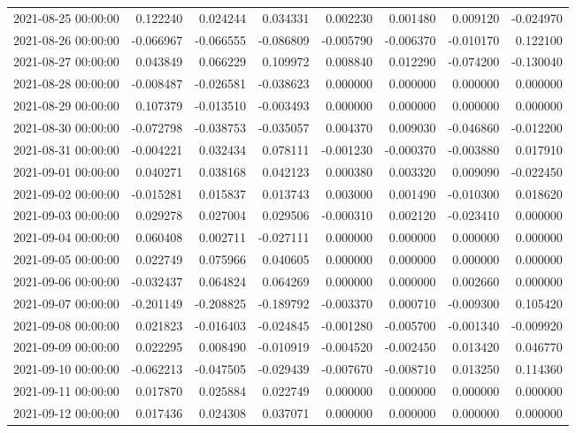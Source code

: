 \begin{tabular}{lrrrrrrr}
2021-08-25 00:00:00 & 0.122240 & 0.024244 & 0.034331 & 0.002230 & 0.001480 & 0.009120 & -0.024970 \\
2021-08-26 00:00:00 & -0.066967 & -0.066555 & -0.086809 & -0.005790 & -0.006370 & -0.010170 & 0.122100 \\
2021-08-27 00:00:00 & 0.043849 & 0.066229 & 0.109972 & 0.008840 & 0.012290 & -0.074200 & -0.130040 \\
2021-08-28 00:00:00 & -0.008487 & -0.026581 & -0.038623 & 0.000000 & 0.000000 & 0.000000 & 0.000000 \\
2021-08-29 00:00:00 & 0.107379 & -0.013510 & -0.003493 & 0.000000 & 0.000000 & 0.000000 & 0.000000 \\
2021-08-30 00:00:00 & -0.072798 & -0.038753 & -0.035057 & 0.004370 & 0.009030 & -0.046860 & -0.012200 \\
2021-08-31 00:00:00 & -0.004221 & 0.032434 & 0.078111 & -0.001230 & -0.000370 & -0.003880 & 0.017910 \\
2021-09-01 00:00:00 & 0.040271 & 0.038168 & 0.042123 & 0.000380 & 0.003320 & 0.009090 & -0.022450 \\
2021-09-02 00:00:00 & -0.015281 & 0.015837 & 0.013743 & 0.003000 & 0.001490 & -0.010300 & 0.018620 \\
2021-09-03 00:00:00 & 0.029278 & 0.027004 & 0.029506 & -0.000310 & 0.002120 & -0.023410 & 0.000000 \\
2021-09-04 00:00:00 & 0.060408 & 0.002711 & -0.027111 & 0.000000 & 0.000000 & 0.000000 & 0.000000 \\
2021-09-05 00:00:00 & 0.022749 & 0.075966 & 0.040605 & 0.000000 & 0.000000 & 0.000000 & 0.000000 \\
2021-09-06 00:00:00 & -0.032437 & 0.064824 & 0.064269 & 0.000000 & 0.000000 & 0.002660 & 0.000000 \\
2021-09-07 00:00:00 & -0.201149 & -0.208825 & -0.189792 & -0.003370 & 0.000710 & -0.009300 & 0.105420 \\
2021-09-08 00:00:00 & 0.021823 & -0.016403 & -0.024845 & -0.001280 & -0.005700 & -0.001340 & -0.009920 \\
2021-09-09 00:00:00 & 0.022295 & 0.008490 & -0.010919 & -0.004520 & -0.002450 & 0.013420 & 0.046770 \\
2021-09-10 00:00:00 & -0.062213 & -0.047505 & -0.029439 & -0.007670 & -0.008710 & 0.013250 & 0.114360 \\
2021-09-11 00:00:00 & 0.017870 & 0.025884 & 0.022749 & 0.000000 & 0.000000 & 0.000000 & 0.000000 \\
2021-09-12 00:00:00 & 0.017436 & 0.024308 & 0.037071 & 0.000000 & 0.000000 & 0.000000 & 0.000000 \\

\end{tabular}
